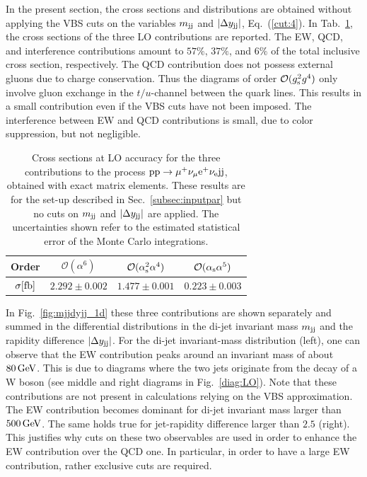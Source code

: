 In the present section, the cross sections and distributions are obtained without applying the VBS cuts on the variables $m_{\text{j}\text{j}}$ and $|\Delta y_{\text{j}\text{j}}|$, 
Eq.~(\ref{cut:4}).
In Tab.~\ref{tab:LOscanXsec}, the cross sections of the three LO contributions are reported.
The EW, QCD, and interference contributions amount to $57\%$, $37\%$, and $6\%$ of the total inclusive cross section, respectively.
The QCD contribution does not possess external gluons due to charge conservation.
Thus the diagrams of order $\mathcal{O}(g_{\rm s}^2g^4)$ only involve gluon exchange in the $t/u$-channel between the quark lines.
This results in a small contribution even if the VBS cuts have not been imposed.
The interference between EW and QCD contributions is small, due to color suppression, but not negligible.

\begin{table}[h!]
    \centering
    \begin{tabular}{c|c|c|c}
        Order & $\mathcal{O}(\alpha^6)$ & $\mathcal{O}(\alpha_\text{s}^2\alpha^4)$ & $\mathcal{O}(\alpha_\text{s}\alpha^5)$ \\
        \hline
        \hline
        $\sigma[\rm{fb}]$ & $ 2.292 \pm 0.002 $ & $ 1.477 \pm 0.001 $ & $ 0.223 \pm 0.003 $ \\
    \end{tabular}
    \caption{\label{tab:LOscanXsec} Cross sections at LO accuracy for the three contributions to the process ${\rm p}{\rm p}\to\mu^+\nu_\mu{\rm e}^+\nu_{\rm e}{\rm j}{\rm j}$, obtained with exact matrix elements.
    These results are for the set-up described in Sec.~\ref{subsec:inputpar} but no cuts on $m_{\text{j}\text{j}}$ and $|\Delta y_{\text{j}\text{j}}|$ are applied.
    The uncertainties shown refer to the estimated statistical error of the Monte Carlo integrations.}
\end{table}

In Fig.~\ref{fig:mjjdyjj_1d} these three contributions are shown separately and summed in the differential distributions in the di-jet invariant mass $m_{\text{j}\text{j}}$ and the rapidity difference $|\Delta y_{\text{j}\text{j}}|$.
For the di-jet invariant-mass distribution (left), one can observe that the EW contribution peaks around an invariant mass of about $80\,\text{GeV}$.
This is due to diagrams where the two jets originate from the decay of a W boson (see middle and right diagrams in Fig.~\ref{diag:LO}).
Note that these contributions are not present in calculations relying on the VBS approximation.
The EW contribution becomes dominant for di-jet invariant mass larger than $500\,\text{GeV}$.
The same holds true for jet-rapidity difference larger than $2.5$ (right).
This justifies why cuts on these two observables are used in order to enhance the EW contribution over the QCD one.
In particular, in order to have a large EW contribution, rather exclusive cuts are required.

